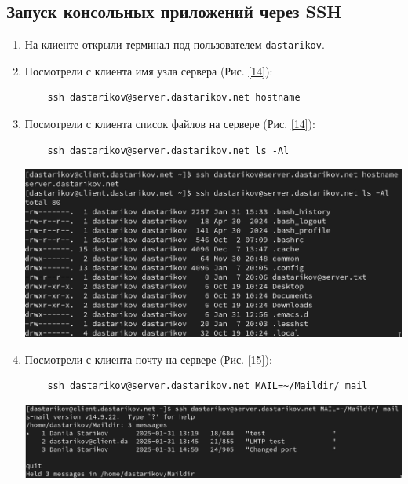 \subsection{Запуск консольных приложений через SSH}
\begin{enumerate}
\item На клиенте открыли терминал под пользователем \texttt{dastarikov}.
\item Посмотрели с клиента имя узла сервера (Рис. \ref{14}):
  \begin{verbatim}
    ssh dastarikov@server.dastarikov.net hostname
  \end{verbatim}

\item Посмотрели с клиента список файлов на сервере (Рис. \ref{14}):
  \begin{verbatim}
    ssh dastarikov@server.dastarikov.net ls -Al
  \end{verbatim}
\begin{center}
  \centering
  \includegraphics[width=\textwidth]{../images/image14.png}
  \label{14}
\end{center}

\item Посмотрели с клиента почту на сервере (Рис. \ref{15}):
  \begin{verbatim}
    ssh dastarikov@server.dastarikov.net MAIL=~/Maildir/ mail
  \end{verbatim}
\begin{center}
  \centering
  \includegraphics[width=\textwidth]{../images/image15.png}
  \label{15}
\end{center}

\end{enumerate}
